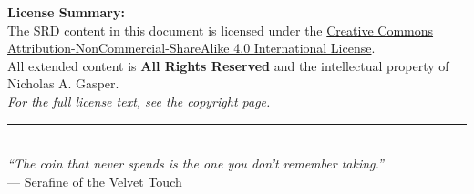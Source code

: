 \begin{center}
\begin{minipage}{0.85\textwidth}
    \vspace{0.2in}

    \textbf{License Summary:}\\[0.1in]
    The SRD content in this document is licensed under the
    \href{http://creativecommons.org/licenses/by-nc-sa/4.0/}{Creative Commons Attribution-NonCommercial-ShareAlike 4.0 International License}.\\[0.1in]
    All extended content is \textbf{All Rights Reserved} and the intellectual property of Nicholas A. Gasper.\\[0.2in]

    \textit{For the full license text, see the copyright page.}
  \end{minipage}

  \vspace{0.3in}
  \rule{0.5\textwidth}{0.4pt}\\[0.2in]
  \textit{``The coin that never spends is the one you don't remember taking.''}\\[0.1in]
  --- Serafine of the Velvet Touch
\end{center}
\cleardoublepage
